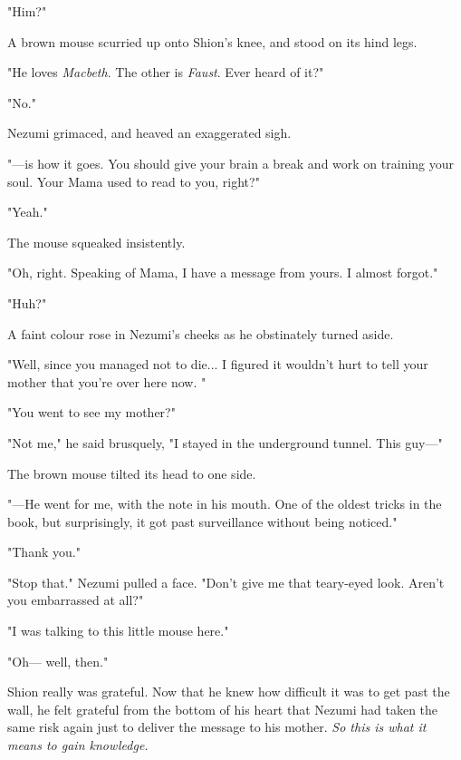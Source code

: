 "Him?"

A brown mouse scurried up onto Shion's knee, and stood on its hind legs.

"He loves \emph{Macbeth}. The other is \emph{Faust}. Ever heard of it?"

"No."

Nezumi grimaced, and heaved an exaggerated sigh.


"---is how it goes. You should give your brain a break and work on
training your soul. Your Mama used to read to you, right?"

"Yeah."

The mouse squeaked insistently.

"Oh, right. Speaking of Mama, I have a message from yours. I almost
forgot."

"Huh?"

A faint colour rose in Nezumi's cheeks as he obstinately turned aside.

"Well, since you managed not to die... I figured it wouldn't hurt to
tell your mother that you're over here now. "

"You went to see my mother?"

"Not me," he said brusquely, "I stayed in the underground tunnel. This
guy---"

The brown mouse tilted its head to one side.

"---He went for me, with the note in his mouth. One of the oldest tricks
in the book, but surprisingly, it got past surveillance without being
noticed."

"Thank you."

"Stop that." Nezumi pulled a face. "Don't give me that teary-eyed look.
Aren't you embarrassed at all?"

"I was talking to this little mouse here."

"Oh--- well, then."

Shion really was grateful. Now that he knew how difficult it was to get
past the wall, he felt grateful from the bottom of his heart that Nezumi
had taken the same risk again just to deliver the message to his mother.
\emph{So this is what it means to gain knowledge.}

